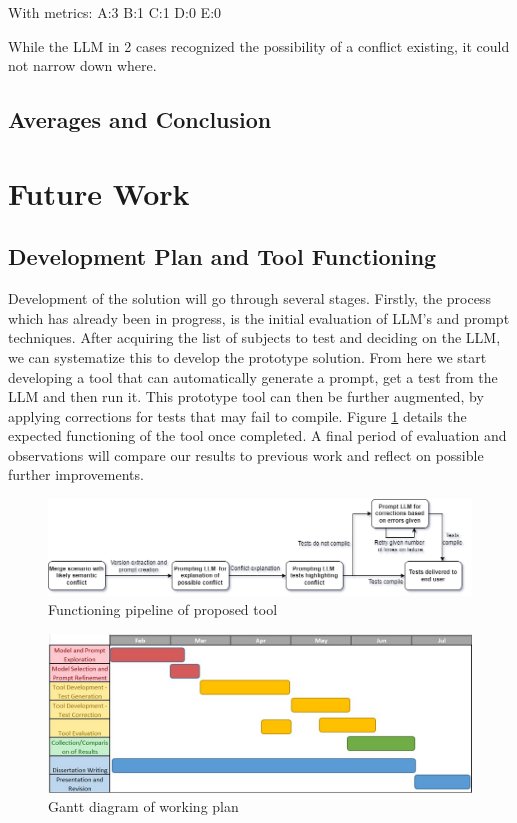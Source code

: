 With metrics:
A:3
B:1
C:1
D:0
E:0

While the LLM in 2 cases recognized the possibility of a conflict existing, it could not narrow down where.

\subsection{Averages and Conclusion}


\section{Future Work}

\subsection{Development Plan and Tool Functioning}

Development of the solution will go through several stages. Firstly, the process which has already been in progress, is the initial evaluation of LLM's and prompt techniques. After acquiring the list of subjects to test and deciding on the LLM, we can systematize this to develop the prototype solution. From here we start developing a tool that can automatically generate a prompt, get a test from the LLM and then run it. This prototype tool can then be further augmented, by applying corrections for tests that may fail to compile. Figure \ref{fig:tool} details the expected functioning of the tool once completed. A final period of evaluation and observations will compare our results to previous work and reflect on possible further improvements.

\begin{figure}
    \centering
    \includegraphics[width=1\linewidth]{figures/tool.png}
    \caption{Functioning pipeline of proposed tool}
    \label{fig:tool}
\end{figure}

\begin{figure}
    \centering
    \includegraphics[width=1\linewidth]{figures/gantt.jpg}
    \caption{Gantt diagram of working plan}
    \label{fig:gantt}
\end{figure}